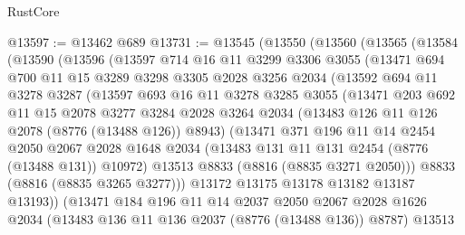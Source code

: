 \begin{lexlean}{RustCore}
\begin{coremodule}
@13597 := @13462 @689
@13731 := @13545
    (@13550
      (@13560
        (@13565
          (@13584
            (@13590
              (@13596
                (@13597
                  @714
                  @16
                  @11
                  @3299
                  @3306
                  @3055
                  (@13471
                    @694
                    @700
                    @11
                    @15
                    @3289
                    @3298
                    @3305
                    @2028
                    @3256
                    @2034
                    (@13592
                      @694
                      @11
                      @3278
                      @3287
                      (@13597
                        @693
                        @16
                        @11
                        @3278
                        @3285
                        @3055
                        (@13471
                          @203
                          @692
                          @11
                          @15
                          @2078
                          @3277
                          @3284
                          @2028
                          @3264
                          @2034
                          (@13483 @126 @11 @126 @2078 (@8776 (@13488 @126)) @8943)
                          (@13471
                            @371
                            @196
                            @11
                            @14
                            @2454
                            @2050
                            @2067
                            @2028
                            @1648
                            @2034
                            (@13483 @131 @11 @131 @2454 (@8776 (@13488 @131)) @10972)
                            @13513
                            @8833
                            (@8816 (@8835 @3271 @2050)))
                          @8833
                          (@8816 (@8835 @3265 @3277)))
                        @13172
                        @13175
                        @13178
                        @13182
                        @13187
                        @13193))
                    (@13471
                      @184
                      @196
                      @11
                      @14
                      @2037
                      @2050
                      @2067
                      @2028
                      @1626
                      @2034
                      (@13483 @136 @11 @136 @2037 (@8776 (@13488 @136)) @8787)
                      @13513

\end{coremodule}
\end{lexlean}
